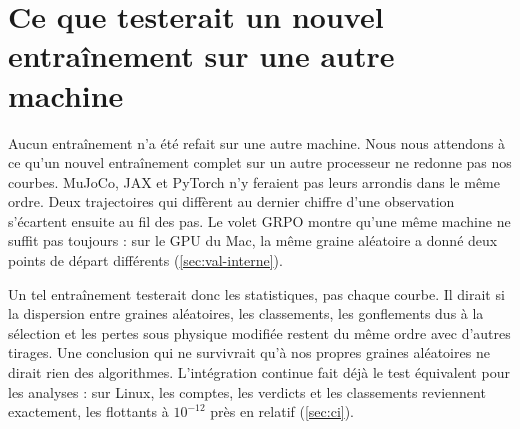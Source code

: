 \section{Ce que testerait un nouvel entraînement sur une autre machine}
\label{sec:reentrainer}

Aucun entraînement n'a été refait sur une autre machine. Nous nous attendons à ce qu'un nouvel
entraînement complet sur un autre processeur ne redonne pas nos courbes. MuJoCo, JAX et PyTorch n'y feraient pas
leurs arrondis dans le même ordre. Deux trajectoires qui diffèrent au dernier chiffre d'une
observation s'écartent ensuite au fil des pas. Le volet GRPO montre qu'une même machine ne suffit pas
toujours : sur le GPU du Mac, la même graine aléatoire a donné deux points de départ différents
(\cref{sec:val-interne}).

Un tel entraînement testerait donc les statistiques, pas chaque courbe. Il dirait si la dispersion
entre graines aléatoires, les classements, les gonflements dus à la sélection et les pertes sous
physique modifiée restent du même ordre avec d'autres tirages. Une conclusion qui ne survivrait
qu'à nos propres graines aléatoires ne dirait rien des algorithmes. L'intégration continue fait déjà
le test équivalent pour les analyses : sur Linux, les comptes, les verdicts et les classements
reviennent exactement, les flottants à $10^{-12}$ près en relatif (\cref{sec:ci}).
